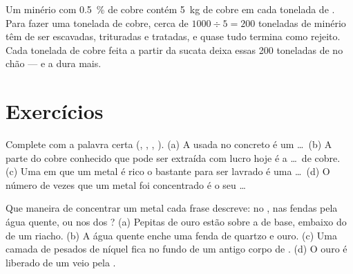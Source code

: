 \begin{example}\label{ex:g9:earth-resources:recycling}
Um minério com \qty{0.5}{\%} de cobre contém \qty{5}{kg} de cobre em cada
tonelada de . Para fazer uma tonelada de cobre, cerca de
$1000 \div 5 = 200$ toneladas de minério têm de ser escavadas,
trituradas e tratadas, e quase tudo termina como rejeito. Cada tonelada
de cobre feita a partir da sucata deixa essas 200 toneladas de  no
chão --- e a  dura mais.
\end{example}


\section{Exercícios}

\begin{exercise}[$\star$]\label{exo:g9:earth-resources:1}
Complete com a palavra certa (, , ,
). (a) A  usada no concreto é um \ldots\ (b) A parte do cobre
conhecido que pode ser extraída com lucro hoje é a \ldots\ de cobre. (c)
Uma  em que um metal é rico o bastante para ser lavrado é uma
\ldots\ (d) O número de vezes que um metal foi concentrado é o seu \ldots
\end{exercise}

\begin{exercise}[$\star$]\label{exo:g9:earth-resources:2}
Que maneira de concentrar um metal cada frase descreve: no , nas
fendas pela água quente, ou nos  dos ? (a) Pepitas de ouro
estão sobre a  de base, embaixo do  de um riacho. (b) A água
quente enche uma fenda de quartzo e ouro. (c) Uma camada de 
pesados de níquel fica no fundo de um antigo corpo de . (d) O ouro
é liberado de um veio pela .
\end{exercise}

